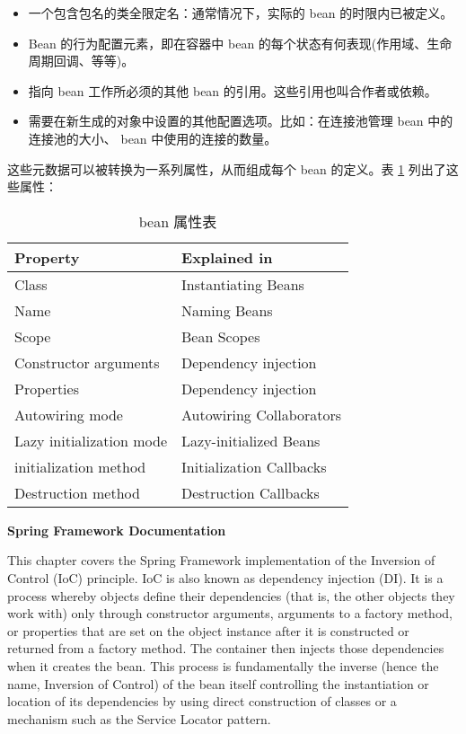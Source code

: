 \begin{itemize}
  \item 一个包含包名的类全限定名：通常情况下，实际的 bean 的时限内已被定义。
  \item Bean 的行为配置元素，即在容器中 bean 的每个状态有何表现(作用域、生命周期回调、等等)。
  \item 指向 bean 工作所必须的其他 bean 的引用。这些引用也叫合作者或依赖。
  \item 需要在新生成的对象中设置的其他配置选项。比如：在连接池管理 bean 中的连接池的大小、 bean 中使用的连接的数量。
\end{itemize}

这些元数据可以被转换为一系列属性，从而组成每个 bean 的定义。表 \ref{tab:bean} 列出了这些属性：

\begin{table}[!ht]
  \centering
  \caption{bean 属性表}
\label{tab:bean}
  \begin{tabularx}{\textwidth}{p{}<{\centering}p{}<{\centering}}
  \toprule
  Property & Explained in \\ \midrule
  Class & Instantiating Beans \\
  Name & Naming Beans \\ 
  Scope & Bean Scopes \\ 
  Constructor arguments & Dependency injection \\ 
  Properties & Dependency injection \\ 
  Autowiring mode & Autowiring Collaborators \\ 
  Lazy initialization mode & Lazy-initialized Beans \\ 
  initialization method & Initialization Callbacks \\
  Destruction method & Destruction Callbacks \\ \bottomrule
  \end{tabularx}
\end{table}





\begin{center}
    \sihao\textbf{Spring Framework Documentation}
\end{center}


This chapter covers the Spring Framework implementation of the Inversion of Control (IoC) principle. IoC is also known as dependency injection (DI). It is a process whereby objects define their dependencies (that is, the other objects they work with) only through constructor arguments, arguments to a factory method, or properties that are set on the object instance after it is constructed or returned from a factory method. The container then injects those dependencies when it creates the bean. This process is fundamentally the inverse (hence the name, Inversion of Control) of the bean itself controlling the instantiation or location of its dependencies by using direct construction of classes or a mechanism such as the Service Locator pattern.

